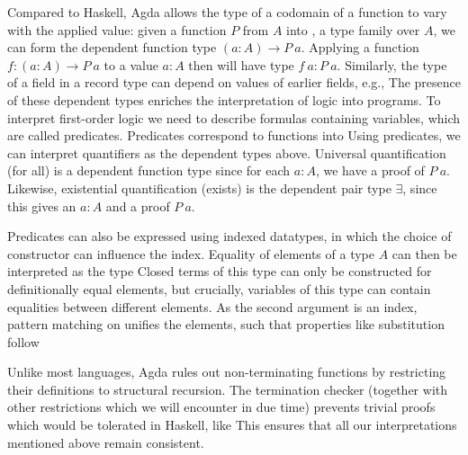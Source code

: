 Compared to Haskell, Agda allows the type of a codomain of a function to vary with the applied value:
given a function $P$ from $A$ into , a type family over $A$, we can form the dependent function type $(a : A) \to P\ a$. Applying a function $f: (a : A) \to P\ a$ to a value $a : A$ then will have type $f\ a : P\ a$. Similarly, the type of a field in a record type can depend on values of earlier fields, e.g.,
The presence of these dependent types enriches the interpretation of logic into programs. To interpret first-order logic we need to describe formulas containing variables, which are called predicates. Predicates correspond to functions into 
Using predicates, we can interpret quantifiers as the dependent types above. Universal quantification (for all) is a dependent function type 
since for each $a : A$, we have a proof of $P\ a$. Likewise, existential quantification (exists) is the dependent pair type $\exists$, since this gives an $a : A$ and a proof $P\ a$. 

Predicates can also be expressed using indexed datatypes, in which the choice of constructor can influence the index. Equality of elements of a type $A$ can then be interpreted as the type
Closed terms of this type can only be constructed for definitionally equal elements, but crucially, variables of this type can contain equalities between different elements. As the second argument is an index, pattern matching on  unifies the elements, such that properties like substitution follow

Unlike most languages, Agda rules out non-terminating functions by restricting their definitions to structural recursion. The termination checker (together with other restrictions which we will encounter in due time) prevents trivial proofs which would be tolerated in Haskell, like
This ensures that all our interpretations mentioned above remain consistent.

\begin{comment}
With this, we can do math. For example, we could define natural numbers as an inductive type
\[ \dots \]
and prove some properties of prime numbers. But to get the same results to binary numbers (without duplicating the proofs), we need a bit more. The usual notion of equalities of types are isomorphisms: two types $A, B$ are isomorphic if there are functions $A \to B$ and $B \to A$, which are mutually inverse 
\[ \dots \]
In ordinary Agda, we cannot directly apply these to transport along like we can for equalities, however.
\end{comment}

